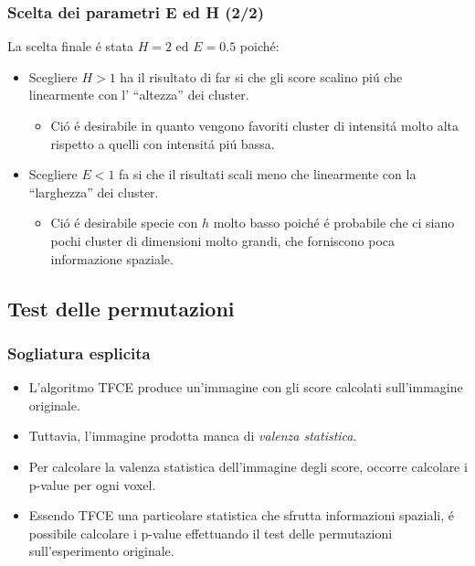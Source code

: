 \documentclass{beamer}
\begin{document}
\begin{frame}
\frametitle{Scelta dei parametri E ed H (2/2)}
La scelta finale \'e stata $H = 2$ ed $E = 0.5$ poich\'e:
\bigskip
\begin{itemize}

\item Scegliere $H > 1$ ha il risultato di far si che gli score scalino pi\'u che linearmente con l' ``altezza'' dei cluster.
\begin{itemize}
\item Ci\'o \'e desirabile in quanto vengono favoriti cluster di intensit\'a molto alta rispetto a quelli con intensit\'a pi\'u bassa.
\end{itemize}
\medskip
\item Scegliere $E < 1$ fa si che il risultati scali meno che linearmente con la ``larghezza'' dei cluster.
\begin{itemize}
\item Ci\'o \'e desirabile specie con $h$ molto basso poich\'e \'e probabile che ci siano pochi cluster di dimensioni molto grandi, che forniscono poca informazione spaziale.
\end{itemize}


\end{itemize}
\end{frame}

\subsection{Test delle permutazioni}
\begin{frame}
\frametitle{Sogliatura esplicita}
\begin{itemize}
\item {}L'algoritmo TFCE produce un'immagine con gli score calcolati sull'immagine originale.

\item {}Tuttavia, l'immagine prodotta manca di \emph{valenza statistica}.

\item {}Per calcolare la valenza statistica dell'immagine degli score, occorre calcolare i \alert{p-value} per ogni voxel.

\item {}Essendo TFCE una particolare statistica che sfrutta informazioni spaziali, \'e possibile calcolare i p-value effettuando il \alert{test delle permutazioni} sull'esperimento originale.
\end{itemize}
\end{frame}
\end{document}
